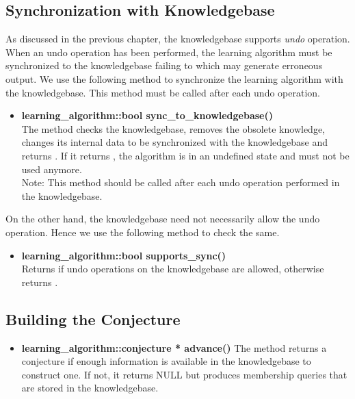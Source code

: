 \subsection*{Synchronization with Knowledgebase}

As discussed in the previous chapter, the knowledgebase supports \emph{undo} operation. When an undo operation has been performed, the learning algorithm must be synchronized to the knowledgebase failing to which may generate erroneous output. We use the following method to synchronize the learning algorithm with the knowledgebase. This method must be called after each undo operation.

\begin{itemize}

 \item \textbf{learning\_algorithm::bool sync\_to\_knowledgebase()} \\
	The method checks the knowledgebase, removes the obsolete knowledge, changes its internal data to be synchronized with the knowledgebase and returns \true. If it returns \false, the algorithm is in an undefined state and must not be used anymore. \\
	Note: This method should be called after each undo operation performed in the knowledgebase.

\end{itemize}

On the other hand, the knowledgebase need not necessarily allow the undo operation. Hence we use the following method to check the same.
\begin{itemize}
 
 \item \textbf{learning\_algorithm::bool supports\_sync()} \\
	 Returns \true if undo operations on the knowledgebase are allowed, otherwise returns \false.

\end{itemize}


\subsection*{Building the Conjecture}

\begin{itemize}
 \item \textbf{learning\_algorithm::conjecture * advance()} \vskip 1pt
	The method returns a conjecture if enough information is available in the knowledgebase to construct one. If not, it returns NULL but produces membership queries that are stored in the knowledgebase.
\end{itemize}

